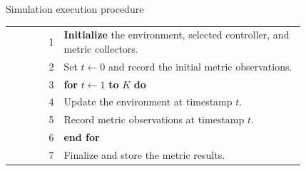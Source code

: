 \begin{algorithm}{Simulation execution procedure}
\label{alg:simulation-execution}
\begin{tabular}{@{}r@{\quad}p{0.82\linewidth}@{}}
1 & \textbf{Initialize} the environment, selected controller, and metric collectors. \\
2 & Set \(t \leftarrow 0\) and record the initial metric observations. \\
3 & \textbf{for} \(t \leftarrow 1\) \textbf{to} \(K\) \textbf{do} \\
4 & \quad Update the environment at timestamp \(t\). \\
5 & \quad Record metric observations at timestamp \(t\). \\
6 & \textbf{end for} \\
7 & Finalize and store the metric results. \\
\end{tabular}
\end{algorithm}
